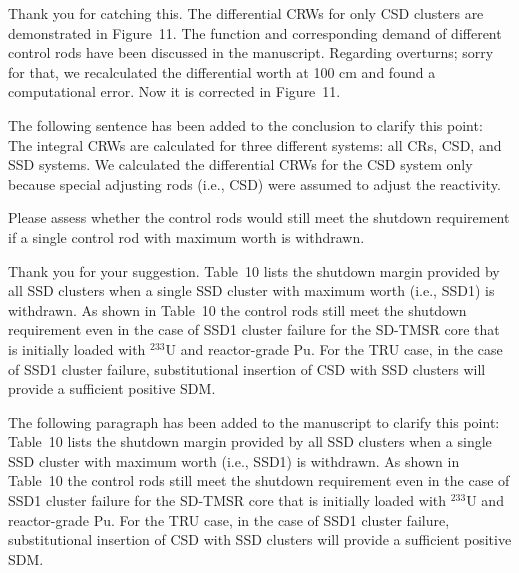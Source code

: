 \documentclass[answers,11pt]{exam}
\begin{document}
\begin{questions}
\begin{solution}
	Thank you for catching this. The differential CRWs for only CSD clusters are demonstrated in Figure~11. The function and corresponding demand of different control rods have been discussed in the manuscript. Regarding overturns; sorry for that, we recalculated the differential worth at 100 cm and found a computational error. Now it is corrected in Figure~11. 	
	
	The following sentence has been added to the conclusion to clarify this point:\\
	
The integral CRWs are calculated for three different systems: all CRs, CSD, and SSD systems. We calculated the differential CRWs for the CSD system only because special adjusting rods (i.e., CSD) were assumed to adjust the reactivity.
	
	
\end{solution}

\question Please assess whether the control rods would still meet the shutdown requirement if a single control rod with maximum worth is withdrawn.
\begin{solution}
	
	Thank you for your suggestion. Table~10 lists the shutdown margin provided by all SSD clusters when a single SSD cluster with maximum worth (i.e., SSD1) is withdrawn. As shown in Table~10 the control rods still meet the shutdown requirement even in the case of SSD1 cluster failure for the SD-TMSR core that is initially loaded with $^{233}$U and reactor-grade Pu. For the TRU case, in the case of SSD1 cluster failure, substitutional insertion of CSD with SSD clusters will provide a sufficient positive SDM. 
	
		The following paragraph has been added to the manuscript to clarify this point:\\
	
	Table~10 lists the shutdown margin provided by all SSD clusters when a single SSD cluster with maximum worth (i.e., SSD1) is withdrawn. As shown in Table~10 the control rods still meet the shutdown requirement even in the case of SSD1 cluster failure for the SD-TMSR core that is initially loaded with $^{233}$U and reactor-grade Pu. For the TRU case, in the case of SSD1 cluster failure, substitutional insertion of CSD with SSD clusters will provide a sufficient positive SDM.
	
	
\end{solution}


\end{questions}
\end{document}
